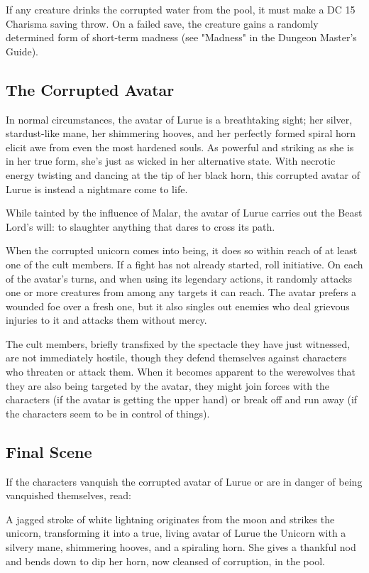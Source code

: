 \documentclass[10pt,a4paper,twoside,bg=print,twocolumn,openany,nodeprecatedcode]{dndbook}
\begin{document}
If any creature drinks the corrupted water from the pool, it must make a DC 15 Charisma saving throw. On a failed save, the creature gains a randomly determined form of short-term madness (see "Madness" in the Dungeon Master's Guide).

\subsection{The Corrupted Avatar}
In normal circumstances, the avatar of Lurue is a breathtaking sight; her silver, stardust-like mane, her shimmering hooves, and her perfectly formed spiral horn elicit awe from even the most hardened souls. As powerful and striking as she is in her true form, she's just as wicked in her alternative state. With necrotic energy twisting and dancing at the tip of her black horn, this corrupted avatar of Lurue is instead a nightmare come to life.

While tainted by the influence of Malar, the avatar of Lurue carries out the Beast Lord's will: to slaughter anything that dares to cross its path.

When the corrupted unicorn comes into being, it does so within reach of at least one of the cult members. If a fight has not already started, roll initiative. On each of the avatar's turns, and when using its legendary actions, it randomly attacks one or more creatures from among any targets it can reach. The avatar prefers a wounded foe over a fresh one, but it also singles out enemies who deal grievous injuries to it and attacks them without mercy.

The cult members, briefly transfixed by the spectacle they have just witnessed, are not immediately hostile, though they defend themselves against characters who threaten or attack them. When it becomes apparent to the werewolves that they are also being targeted by the avatar, they might join forces with the characters (if the avatar is getting the upper hand) or break off and run away (if the characters seem to be in control of things).

\subsection{Final Scene}
If the characters vanquish the corrupted avatar of Lurue or are in danger of being vanquished themselves, read:

\begin{DndReadAloud}{}
A jagged stroke of white lightning originates from the moon and strikes the unicorn, transforming it into a true, living avatar of Lurue the Unicorn with a silvery mane, shimmering hooves, and a spiraling horn. She gives a thankful nod and bends down to dip her horn, now cleansed of corruption, in the pool.

\end{DndReadAloud}
\end{document}
